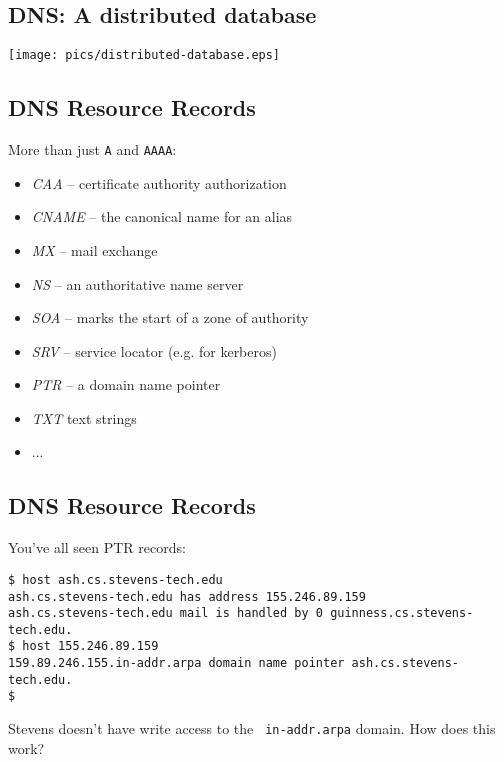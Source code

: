 \documentclass[xga]{xdvislides}
\begin{document}
\subsection{DNS: A distributed database}
\vspace*{\fill}
\begin{center}
	\texttt{[image: pics/distributed-database.eps]}
\end{center}
\vspace*{\fill}


\subsection{DNS Resource Records}
More than just {\tt A} and {\tt AAAA}:
\begin{itemize}
	\item {\em CAA} -- certificate authority authorization
	\item {\em CNAME} -- the canonical name for an alias
	\item {\em MX} -- mail exchange
	\item {\em NS} -- an authoritative name server
	\item {\em SOA} -- marks the start of a zone of authority
	\item {\em SRV} -- service locator (e.g. for kerberos)
	\item {\em PTR} -- a domain name pointer
	\item {\em TXT} text strings
	\item ...
\end{itemize}

\subsection{DNS Resource Records}
You've all seen PTR records:
\\

\begin{verbatim}
$ host ash.cs.stevens-tech.edu
ash.cs.stevens-tech.edu has address 155.246.89.159
ash.cs.stevens-tech.edu mail is handled by 0 guinness.cs.stevens-tech.edu.
$ host 155.246.89.159
159.89.246.155.in-addr.arpa domain name pointer ash.cs.stevens-tech.edu.
$ 
\end{verbatim}

Stevens doesn't have write access to the {\tt
in-addr.arpa} domain.  How does this work?
\end{document}
